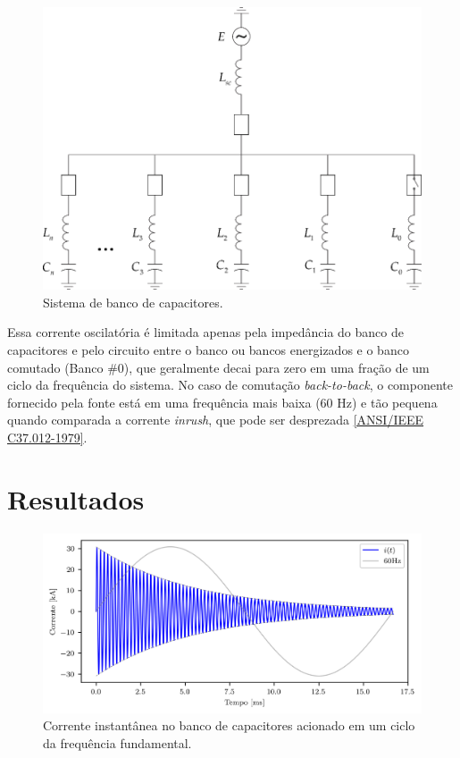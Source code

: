 \documentclass[a4paper]{article}
\begin{document}
	
\begin{figure}[!hbp]
	\centering
	\includegraphics{figs/Picture1}
	\caption{Sistema de banco de capacitores.}
	\label{fig:picture1}
\end{figure}


Essa corrente oscilatória é limitada apenas pela impedância do banco de capacitores e pelo circuito entre o banco ou bancos energizados e o banco comutado (Banco \#0), que geralmente decai para zero em uma fração de um ciclo da frequência do sistema. No caso de comutação \textit{back-to-back}, o componente fornecido pela fonte está em uma frequência mais baixa (60 Hz) e tão pequena quando comparada a corrente \textit{inrush}, que pode ser desprezada \href{https://ieeexplore.ieee.org/document/7035261}{[ANSI/IEEE C37.012-1979]}.



\section{Resultados}
\begin{figure}[!hbp]
	\centering
	\includegraphics{figs/Correntes.png}
	\caption{Corrente instantânea no banco de capacitores acionado em um ciclo da frequência fundamental.}
	\label{fig:picture2}
\end{figure}
\end{document}
